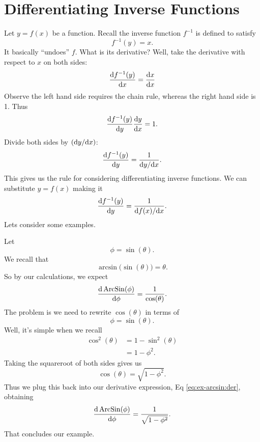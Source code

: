 
\section{Differentiating Inverse Functions}

Let $y=f(x)$ be a function. Recall the inverse function $f^{-1}$
is defined to satisfy
\begin{equation}
f^{-1}(y)=x.
\end{equation}
It basically ``undoes'' $f$. What is its derivative? Well, take
the derivative with respect to $x$ on both sides:
\begin{equation}
\frac{\mathrm{d} f^{-1}(y)}{\mathrm{d} x}=\frac{\mathrm{d} x}{\mathrm{d} x}
\end{equation}
Observe the left hand side requires the chain rule, whereas the
right hand side is 1. Thus
\begin{equation}
\frac{\mathrm{d} f^{-1}(y)}{\mathrm{d} y}\frac{\mathrm{d} y}{\mathrm{d} x}=1.
\end{equation}
Divide both sides by $(\mathrm{d} y/\mathrm{d} x)$:
\begin{equation}
\frac{\mathrm{d} f^{-1}(y)}{\mathrm{d} y} = \frac{1}{\mathrm{d} y/\mathrm{d} x}.
\end{equation}
This gives us the rule for considering differentiating inverse
functions. We can substitute $y=f(x)$ making it
\begin{equation}
\frac{\mathrm{d} f^{-1}(y)}{\mathrm{d} y}=\frac{1}{\mathrm{d} f(x)/\mathrm{d} x}.
\end{equation}
Lets consider some examples.

Let
\begin{equation}
\phi=\sin(\theta).
\end{equation}
We recall that
\begin{equation}
\arcsin\bigl(\sin(\theta)\bigr)=\theta.
\end{equation}
So by our calculations, we expect
\begin{equation}\label{eq:ex-arcsin:der}
\frac{\mathrm{d}\mathop{\mathrm{ArcSin}}\nolimits(\phi)}{\mathrm{d}\phi}=\frac{1}{\cos(\theta)}.
\end{equation}
The problem is we need to rewrite $\cos(\theta)$ in terms of
\begin{equation}
\phi=\sin(\theta).
\end{equation}
Well, it's simple when we recall
\begin{equation}
\begin{split}
\cos^{2}(\theta)&=1-\sin^{2}(\theta)\\
&=1-\phi^{2}.
\end{split}
\end{equation}
Taking the squareroot of both sides gives us
\begin{equation}
\cos(\theta)=\sqrt{1-\phi^{2}}.
\end{equation}
Thus we plug this back into our derivative expression, Eq \eqref{eq:ex-arcsin:der},
obtaining
\begin{equation}
\frac{\mathrm{d}\mathop{\mathrm{ArcSin}}\nolimits(\phi)}{\mathrm{d}\phi}=\frac{1}{\sqrt{1-\phi^{2}}}.
\end{equation}
That concludes our example.

